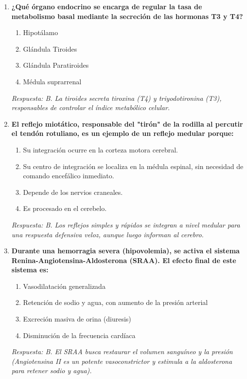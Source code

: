 \begin{enumerate}[label=\textbf{\arabic*.}]
    \item \textbf{¿Qué órgano endocrino se encarga de regular la tasa de metabolismo basal mediante la secreción de las hormonas T3 y T4?}
    \begin{enumerate}
        \item[A)] Hipotálamo
        \item[B)] Glándula Tiroides
        \item[C)] Glándula Paratiroides
        \item[D)] Médula suprarrenal
    \end{enumerate}
    \textit{Respuesta: B. La tiroides secreta tiroxina (T4) y triyodotironina (T3), responsables de controlar el índice metabólico celular.}

    \item \textbf{El reflejo miotático, responsable del "tirón" de la rodilla al percutir el tendón rotuliano, es un ejemplo de un reflejo medular porque:}
    \begin{enumerate}
        \item[A)] Su integración ocurre en la corteza motora cerebral.
        \item[B)] Su centro de integración se localiza en la médula espinal, sin necesidad de comando encefálico inmediato.
        \item[C)] Depende de los nervios craneales.
        \item[D)] Es procesado en el cerebelo.
    \end{enumerate}
    \textit{Respuesta: B. Los reflejos simples y rápidos se integran a nivel medular para una respuesta defensiva veloz, aunque luego informan al cerebro.}

    \item \textbf{Durante una hemorragia severa (hipovolemia), se activa el sistema Renina-Angiotensina-Aldosterona (SRAA). El efecto final de este sistema es:}
    \begin{enumerate}
        \item[A)] Vasodilatación generalizada
        \item[B)] Retención de sodio y agua, con aumento de la presión arterial
        \item[C)] Excreción masiva de orina (diuresis)
        \item[D)] Disminución de la frecuencia cardíaca
    \end{enumerate}
    \textit{Respuesta: B. El SRAA busca restaurar el volumen sanguíneo y la presión (Angiotensina II es un potente vasoconstrictor y estimula a la aldosterona para retener sodio y agua).}

\end{enumerate}

